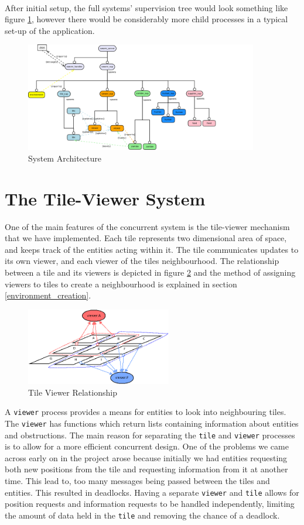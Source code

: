 \documentclass[10pt, a4paper, conference, compsocconf]{IEEEtran}
\begin{document}
\\
After initial setup, the full systems' supervision tree would look something like figure \ref{fig:system_ws}, however there would be considerably more child processes in a typical set-up of the application.
\begin{figure}[h]
  \centering
  \includegraphics[width=4in]{../img/final_system_ws.png}
\caption{System Architecture}
    \label{fig:system_ws}
\end{figure}

\section{The Tile-Viewer System \label{tile_viewer}}
One of the main features of the concurrent system is the tile-viewer mechanism that we have implemented. Each tile represents two dimensional area of space, and keeps track of the entities acting within it. The tile communicates updates to its own viewer, and each viewer of the tiles neighbourhood. The relationship between a tile and its viewers is depicted in figure \ref{fig:tile_viewer_rel} and the method of assigning viewers to tiles to create a neighbourhood is explained in section \ref{environment_creation}.
\begin{figure}[h]
  \centering
  \includegraphics[width=2.5in]{../img/tile_to_viewer_map.png}
  \caption{Tile Viewer Relationship}
  \label{fig:tile_viewer_rel}
\end{figure}

A \verb+viewer+ process provides a means for entities to look into neighbouring tiles. The \verb+viewer+ has functions which return lists containing information about entities and obstructions. The main reason for separating the \verb+tile+ and \verb+viewer+ processes is to allow for a more efficient concurrent design. One of the problems we came across early on in the project arose because initially we had entities requesting both new positions from the tile and requesting information from it at another time. This lead to, too many messages being passed between the tiles and entities. This resulted in deadlocks. Having a separate \verb+viewer+ and \verb+tile+ allows for position requests and information requests to be handled independently, limiting the amount of data held in the \verb+tile+ and removing the chance of a deadlock.
\end{document}
